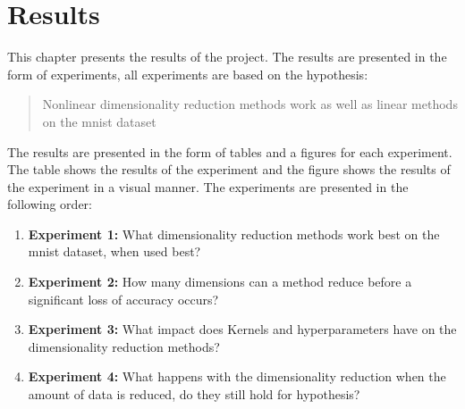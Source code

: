 \chapter{Results}\label{cha:results}
This chapter presents the results of the project. The results are presented in the form of experiments, all experiments are based on the hypothesis: \begin{quote}
    Nonlinear dimensionality reduction methods work as well as linear methods on the \gls{mnist} dataset
\end{quote}
The results are presented in the form of tables and a figures for each experiment. The table shows the results of the experiment and the figure shows the results of the experiment in a visual manner.  The experiments are presented in the following order:
\begin{enumerate}
    \item \textbf{Experiment 1:} What dimensionality reduction methods work best on the \gls{mnist} dataset, when used best?
    \item \textbf{Experiment 2:} How many dimensions can a method reduce before a significant loss of accuracy occurs?
    \item \textbf{Experiment 3:} What impact does Kernels and hyperparameters have on the dimensionality reduction methods?
    \item \textbf{Experiment 4:} What happens with the dimensionality reduction when the amount of data is reduced, do they still hold for hypothesis?
\end{enumerate}





